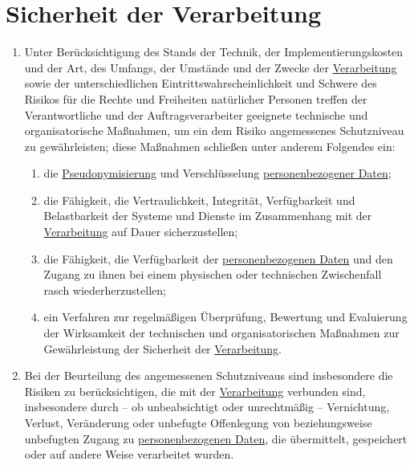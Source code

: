 \chapter{Sicherheit der Verarbeitung}
\label{ch:32}


\begin{enumerate}

  \item Unter Berücksichtigung des Stands der Technik, der Implementierungskosten und der Art, des Umfangs, der Umstände
   und der Zwecke der \hyperref[itm:04-2]{Verarbeitung} sowie der unterschiedlichen Eintrittswahrscheinlichkeit und Schwere des Risikos für
   die Rechte und Freiheiten natürlicher Personen treffen der Verantwortliche und der Auftragsverarbeiter geeignete
   technische und organisatorische Maßnahmen, um ein dem Risiko angemessenes Schutzniveau zu gewährleisten; diese
   Maßnahmen schließen unter anderem Folgendes ein:
  \label{itm:32-1}

  \begin{enumerate}
  
    \item die \hyperref[itm:04-5]{Pseudonymisierung} und Verschlüsselung \hyperref[itm:04-1]{personenbezogener Daten};
    \label{itm:32-1a}

    \item die Fähigkeit, die Vertraulichkeit, Integrität, Verfügbarkeit und Belastbarkeit der Systeme und Dienste im
     Zusammenhang mit der \hyperref[itm:04-2]{Verarbeitung} auf Dauer sicherzustellen;
    \label{itm:32-1b}

    \item die Fähigkeit, die Verfügbarkeit der \hyperref[itm:04-1]{personenbezogenen Daten} und den Zugang zu ihnen bei einem physischen oder
     technischen Zwischenfall rasch wiederherzustellen;
    \label{itm:32-1c}

    \item ein Verfahren zur regelmäßigen Überprüfung, Bewertung und Evaluierung der Wirksamkeit der technischen und
     organisatorischen Maßnahmen zur Gewährleistung der Sicherheit der \hyperref[itm:04-2]{Verarbeitung}.
    \label{itm:32-1d}

  \end{enumerate}

  \item Bei der Beurteilung des angemessenen Schutzniveaus sind insbesondere die Risiken zu berücksichtigen, die mit der
   \hyperref[itm:04-2]{Verarbeitung} verbunden sind, insbesondere durch -- ob unbeabsichtigt oder unrechtmäßig -- Vernichtung, Verlust,
   Veränderung oder unbefugte Offenlegung von beziehungsweise unbefugten Zugang zu \hyperref[itm:04-1]{personenbezogenen Daten}, die
   übermittelt, gespeichert oder auf andere Weise verarbeitet wurden.
  \label{itm:32-2}


\end{enumerate}
